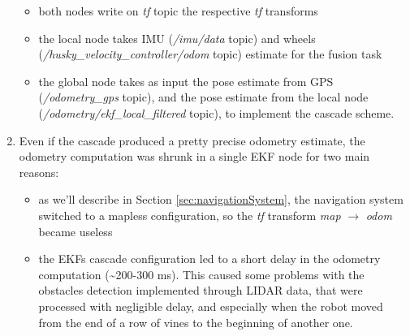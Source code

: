 \begin{enumerate}
	\begin{itemize}
		\item both nodes write on \textit{tf} topic the respective \textit{tf} transforms
		\item the local node takes \ac{IMU} (\textit{/imu/data} topic) and wheels \\ (\textit{/husky\_velocity\_controller/odom} topic) estimate for the fusion task
		\item the global node takes as input the pose estimate from GPS (\textit{/odometry\_gps} topic), and the pose estimate from the local node (\textit{/odometry/ekf\_local\_filtered} topic), to implement the cascade scheme.
	\end{itemize}

	\item Even if the cascade produced a pretty precise odometry estimate, the odometry computation was shrunk in a single \ac{EKF} node for two main reasons:
	\begin{itemize}
		\item as we'll describe in Section \ref{sec:navigationSystem}, the navigation system switched to a mapless configuration, so the \textit{tf} transform  \textit{map} $\rightarrow$ \textit{odom} became useless
		\item the \ac{EKF}s cascade configuration led to a short delay in the odometry computation (\textasciitilde200-300 ms). This caused some problems with the obstacles detection implemented through \ac{LIDAR} data, that were processed with negligible delay, and especially when the robot moved from the end of a row of vines to the beginning of another one. 
	\end{itemize}
\end{enumerate}

